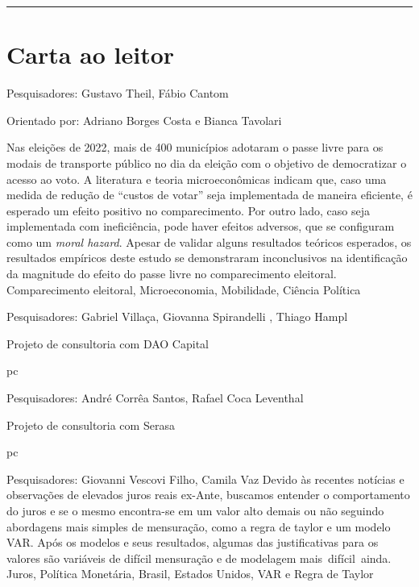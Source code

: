 \documentclass[
    10pt, 
    a4paper, 
    draft
    ]{article}
\begin{document}


\tableofcontents


\bigskip\bigskip

\noindent\rule{\linewidth}{.5pt}

\section*{Carta ao leitor}

    {
        \noindent Pesquisadores: Gustavo Theil, Fábio Cantom

        \noindent Orientado por: Adriano Borges Costa e Bianca Tavolari
    }
    {
        Nas eleições de 2022, mais de 400 municípios adotaram o passe livre para os modais de transporte público no dia da eleição com o objetivo de democratizar o acesso ao voto. A literatura e teoria microeconômicas indicam que, caso uma medida de redução de ``custos de votar'' seja implementada de maneira eficiente, é esperado um efeito positivo no comparecimento. Por outro lado, caso seja implementada com ineficiência, pode haver efeitos adversos, que se configuram como um \textit{moral hazard}. Apesar de validar alguns resultados teóricos esperados, os resultados empíricos deste estudo se demonstraram inconclusivos na identificação da magnitude do efeito do passe livre no comparecimento eleitoral. 
    }
    {Comparecimento eleitoral, Microeconomia, Mobilidade, Ciência Política}




    {
        \noindent Pesquisadores: Gabriel Villaça, Giovanna Spirandelli , Thiago Hampl

        \noindent Projeto de consultoria com DAO Capital
    }
    {\lipsum[1-1]}
    {pc}



    {
        \noindent Pesquisadores: André Corrêa Santos, Rafael Coca Leventhal

        \noindent Projeto de consultoria com Serasa
    }
    {\lipsum[1-1]}
    {pc}



    {\noindent Pesquisadores: Giovanni Vescovi Filho, Camila Vaz}
    {Devido às recentes notícias e observações de elevados juros reais ex-Ante, buscamos entender o comportamento do juros e se o mesmo encontra-se em um valor alto demais ou não seguindo abordagens mais simples de mensuração, como a regra de taylor e um modelo VAR. Após os modelos e seus resultados, algumas das justificativas para os valores são variáveis de difícil mensuração e de modelagem mais difícil ainda.}
    {Juros, Política Monetária, Brasil, Estados Unidos, VAR e Regra de Taylor
    }
\end{document}
